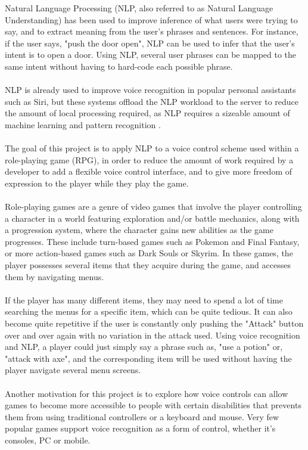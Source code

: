 \documentclass[12pt]{article}
\begin{document}
Natural Language Processing (NLP, also referred to as Natural Language Understanding) has been used to improve inference of what users were trying to say, and to extract meaning from the user's phrases and sentences. For instance, if the user says, "push the door open", NLP can be used to infer that the user's intent is to open a door. Using NLP, several user phrases can be mapped to the same intent without having to hard-code each possible phrase.
\\
\\
NLP is already used to improve voice recognition in popular personal assistants such as Siri, but these systems offload the NLP workload to the server to reduce the amount of local processing required, as NLP requires a sizeable amount of machine learning and pattern recognition \cite{RefWorks:21}.
\\
\\
The goal of this project is to apply NLP to a voice control scheme used within a role-playing game (RPG), in order to reduce the amount of work required by a developer to add a flexible voice control interface, and to give more freedom of expression to the player while they play the game.
\\
\\
Role-playing games are a genre of video games that involve the player controlling a character in a world featuring exploration and/or battle mechanics, along with a progression system, where the character gains new abilities as the game progresses. These include turn-based games such as Pokemon and Final Fantasy, or more action-based games such as Dark Souls or Skyrim. In these games, the player possesses several items that they acquire during the game, and accesses them by navigating menus.
\\
\\
If the player has many different items, they may need to spend a lot of time searching the menus for a specific item, which can be quite tedious. It can also become quite repetitive if the user is constantly only pushing the "Attack" button over and over again with no variation in the attack used. Using voice recognition and NLP, a player could just simply say a phrase such as, "use a potion" or, "attack with axe", and the corresponding item will be used without having the player navigate several menu screens.
\\
\\
Another motivation for this project is to explore how voice controls can allow games to become more accessible to people with certain disabilities that prevents them from using traditional controllers or a keyboard and mouse. Very few popular games support voice recognition as a form of control, whether it's consoles, PC or mobile.
\end{document}
